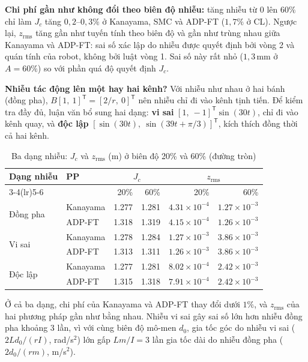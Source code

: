 \documentclass[12pt,a4paper]{article}
\newcommand{\T}{\mathsf{T}}
\begin{document}
\textbf{Chi phí gần như không đổi theo biên độ nhiễu:} tăng nhiễu từ $0$ lên $60\%$ chỉ làm $J_c$ tăng $0{,}2$--$0{,}3\%$ ở Kanayama, SMC và ADP-FT ($1{,}7\%$ ở CL). Ngược lại, $z_\text{rms}$ tăng gần như tuyến tính theo biên độ và gần như trùng nhau giữa Kanayama và ADP-FT: sai số xác lập do nhiễu được quyết định bởi vòng 2 và quán tính của robot, không bởi luật vòng 1. Sai số này rất nhỏ ($1{,}3$\,mm ở $A = 60\%$) so với phần quá độ quyết định $J_c$.

\textbf{Nhiễu tác động lên một hay hai kênh?} Với nhiễu như nhau ở hai bánh (đồng pha), $B[1,\ 1]^\T = [2/r,\ 0]^\T$ nên nhiễu chỉ đi vào kênh tịnh tiến. Để kiểm tra đầy đủ, luận văn bổ sung hai dạng: \textbf{vi sai} $[1,\ -1]^\T\sin(30t)$, chỉ đi vào kênh quay, và \textbf{độc lập} $[\sin(30t),\ \sin(39t + \pi/3)]^\T$, kích thích đồng thời cả hai kênh.

\begin{table}[H]
\centering
\caption{Ba dạng nhiễu: $J_c$ và $z_\text{rms}$ (m) ở biên độ 20\% và 60\% (đường tròn)}
\label{tab:dist_channels}
\small
\begin{tabular}{llrrrr}
\toprule
\multirow{2}{*}{\textbf{Dạng nhiễu}} & \multirow{2}{*}{\textbf{PP}} & \multicolumn{2}{c}{$J_c$} & \multicolumn{2}{c}{$z_\text{rms}$} \\
\cmidrule(lr){3-4}\cmidrule(lr){5-6}
 & & 20\% & 60\% & 20\% & 60\% \\
\midrule
\multirow{2}{*}{Đồng pha} & Kanayama & 1.277 & 1.281 & $4.31\times10^{-4}$ & $1.27\times10^{-3}$ \\
 & ADP-FT & 1.318 & 1.319 & $4.15\times10^{-4}$ & $1.26\times10^{-3}$ \\
\midrule
\multirow{2}{*}{Vi sai} & Kanayama & 1.278 & 1.284 & $1.27\times10^{-3}$ & $3.86\times10^{-3}$ \\
 & ADP-FT & 1.313 & 1.311 & $1.26\times10^{-3}$ & $3.86\times10^{-3}$ \\
\midrule
\multirow{2}{*}{Độc lập} & Kanayama & 1.277 & 1.281 & $8.02\times10^{-4}$ & $2.42\times10^{-3}$ \\
 & ADP-FT & 1.315 & 1.318 & $7.91\times10^{-4}$ & $2.42\times10^{-3}$ \\
\bottomrule
\end{tabular}
\end{table}

Ở cả ba dạng, chi phí của Kanayama và ADP-FT thay đổi dưới $1\%$, và $z_\text{rms}$ của hai phương pháp gần như bằng nhau. Nhiễu vi sai gây sai số lớn hơn nhiễu đồng pha khoảng $3$ lần, vì với cùng biên độ mô-men $d_0$, gia tốc góc do nhiễu vi sai ($2Ld_0/(rI)$, rad/s$^2$) lớn gấp $Lm/I = 3$ lần gia tốc dài do nhiễu đồng pha ($2d_0/(rm)$, m/s$^2$).
\end{document}
